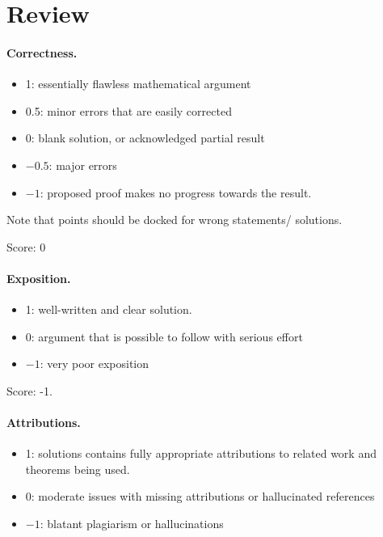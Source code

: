 \documentclass[11pt]{article}
\theoremstyle{remark}
\begin{document}
\maketitle

\section{Review}

\paragraph{Correctness.}
\begin{itemize}
	\item  1: essentially flawless mathematical argument
	\item  0.5: minor errors that are easily corrected
	\item  0: blank solution, or acknowledged partial result
	\item  $-0.5$: major errors
	\item  $-1$: proposed proof makes no progress towards the result.
\end{itemize}
Note that points should be docked for wrong statements/ solutions.

\noindent Score: 0


\paragraph{Exposition.}
\begin{itemize}
	\item  1: well-written and clear solution.
	\item  0: argument that is possible to follow with serious effort
	\item  $-1$: very poor exposition
\end{itemize}

\noindent Score: -1. 

\paragraph{Attributions.}
\begin{itemize}
	\item  1: solutions contains fully appropriate attributions
		to related work and theorems being used.
	\item  0: moderate issues with missing attributions or hallucinated references
	\item  $-1$: blatant plagiarism or hallucinations
\end{itemize}
\end{document}
